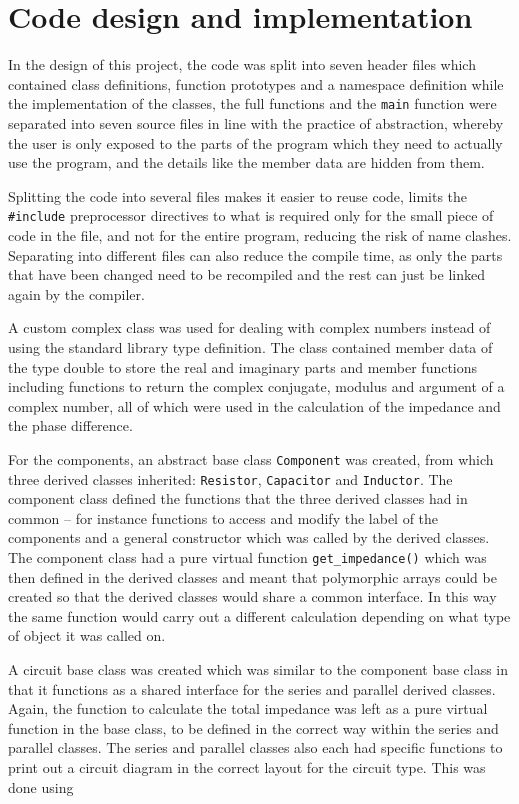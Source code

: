 \section{Code design and implementation}
\label{sec:code}
In the design of this project, the code was split into seven header files which contained class definitions, function prototypes and a namespace definition while the implementation of the classes, the full functions and the \verb!main! function were separated into seven source files in line with the practice of abstraction, whereby the user is only exposed to the parts of the program which they need to actually use the program, and the details like the member data are hidden from them.

Splitting the code into several files makes it easier to reuse code, limits the \verb!#include! preprocessor directives to what is required only for the small piece of code in the file, and not for the entire program, reducing the risk of name clashes. Separating into different files can also reduce the compile time, as only the parts that have been changed need to be recompiled and the rest can just be linked again by the compiler.

A custom complex class was used for dealing with complex numbers instead of using the standard library type definition. The class contained member data of the type double to store the real and imaginary parts and member functions including functions to return the complex conjugate, modulus and argument of a complex number, all of which were used in the calculation of the impedance and the phase difference.

For the components, an abstract base class \verb!Component! was created, from which three derived classes inherited: \verb!Resistor!, \verb!Capacitor! and \verb!Inductor!. The component class defined the functions that the three derived classes had in common -- for instance functions to access and modify the label of the components and a general constructor which was called by the derived classes. The component class had a pure virtual function \verb!get_impedance()! which was then defined in the derived classes and meant that polymorphic arrays could be created so that the derived classes would share a common interface. In this way the same function would carry out a different calculation depending on what type of object it was called on.

A circuit base class was created which was similar to the component base class in that it functions as a shared interface for the series and parallel derived classes. Again, the function to calculate the total impedance was left as a pure virtual function in the base class, to be defined in the correct way within the series and parallel classes. The series and parallel classes also each had specific functions to print out a circuit diagram in the correct layout for the circuit type. This was done using

